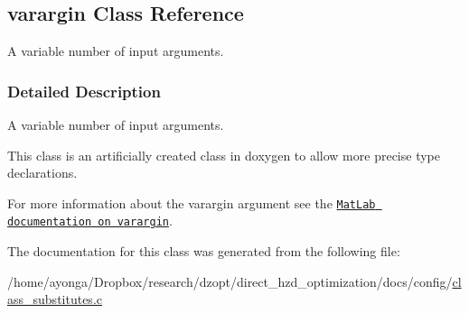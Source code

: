 \hypertarget{classvarargin}{}\subsection{varargin Class Reference}
\label{classvarargin}


A variable number of input arguments.  




\subsubsection{Detailed Description}
A variable number of input arguments. 

This class is an artificially created class in doxygen to allow more precise type declarations.

For more information about the varargin argument see the \href{http://www.mathworks.de/help/techdoc/ref/varargin.html}{\tt Mat\+Lab documentation on varargin}. 

The documentation for this class was generated from the following file\+:\begin{DoxyCompactItemize}
\item 
/home/ayonga/\+Dropbox/research/dzopt/direct\+\_\+hzd\+\_\+optimization/docs/config/\hyperlink{class__substitutes_8c}{class\+\_\+substitutes.\+c}\end{DoxyCompactItemize}

